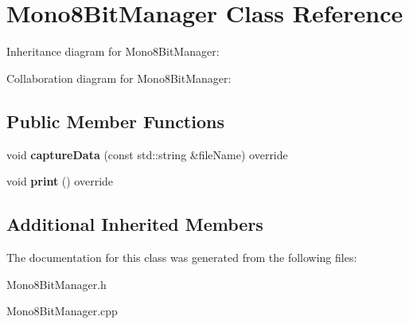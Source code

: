 \hypertarget{classMono8BitManager}{}\section{Mono8\+Bit\+Manager Class Reference}
\label{classMono8BitManager}


Inheritance diagram for Mono8\+Bit\+Manager\+:


Collaboration diagram for Mono8\+Bit\+Manager\+:
\subsection*{Public Member Functions}
\begin{DoxyCompactItemize}
\item 
\mbox{\label{classMono8BitManager_a6a009f06f08d66bc65c70ed448066f75}} 
void {\bfseries capture\+Data} (const std\+::string \&file\+Name) override
\item 
\mbox{\label{classMono8BitManager_a8deb0d0de060d96f0434164963a36774}} 
void {\bfseries print} () override
\end{DoxyCompactItemize}
\subsection*{Additional Inherited Members}


The documentation for this class was generated from the following files\+:\begin{DoxyCompactItemize}
\item 
Mono8\+Bit\+Manager.\+h\item 
Mono8\+Bit\+Manager.\+cpp\end{DoxyCompactItemize}
